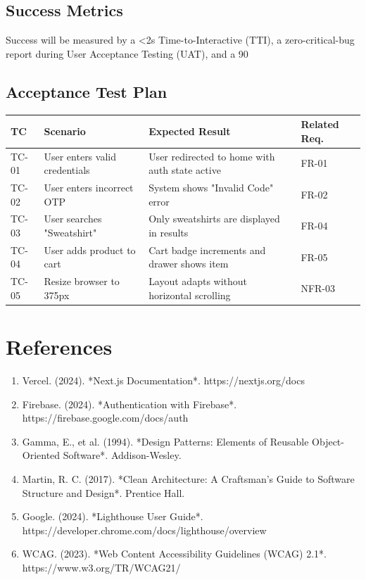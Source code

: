 \documentclass[11pt]{article}
\newcommand{\scorebox}[1]{%
  \hfill\fcolorbox{black}{gray!10}{\textbf{#1}}%
}
\newcommand{\scoredsection}[2]{\section{\texorpdfstring{#1~\scorebox{#2}}{#1}}}
\begin{document}
\subsection*{Success Metrics}
Success will be measured by a <2s Time-to-Interactive (TTI), a zero-critical-bug report during User Acceptance Testing (UAT), and a 90%

\subsection*{Acceptance Test Plan}
\begin{longtable}{p{} p{} p{} p{}}
\toprule
\textbf{TC} & \textbf{Scenario} & \textbf{Expected Result} & \textbf{Related Req.} \\
\midrule
TC-01 & User enters valid credentials & User redirected to home with auth state active & FR-01 \\
TC-02 & User enters incorrect OTP & System shows "Invalid Code" error & FR-02 \\
TC-03 & User searches "Sweatshirt" & Only sweatshirts are displayed in results & FR-04 \\
TC-04 & User adds product to cart & Cart badge increments and drawer shows item & FR-05 \\
TC-05 & Resize browser to 375px & Layout adapts without horizontal scrolling & NFR-03 \\
\bottomrule
\end{longtable}

\scoredsection{References}{Related rubric: 10 pts}
\begin{enumerate}
    \item Vercel. (2024). *Next.js Documentation*. https://nextjs.org/docs
    \item Firebase. (2024). *Authentication with Firebase*. https://firebase.google.com/docs/auth
    \item Gamma, E., et al. (1994). *Design Patterns: Elements of Reusable Object-Oriented Software*. Addison-Wesley.
    \item Martin, R. C. (2017). *Clean Architecture: A Craftsman's Guide to Software Structure and Design*. Prentice Hall.
    \item Google. (2024). *Lighthouse User Guide*. https://developer.chrome.com/docs/lighthouse/overview
    \item WCAG. (2023). *Web Content Accessibility Guidelines (WCAG) 2.1*. https://www.w3.org/TR/WCAG21/
\end{enumerate}
\end{document}

